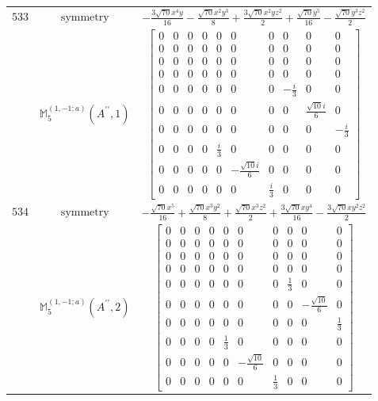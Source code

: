 \documentclass[fleqn,8pt,landscape]{jsarticle}
\begin{document}
\begin{longtable}{ccc}
$ 533 $ & $ \text{symmetry} $ & $ - \frac{3 \sqrt{70} x^{4} y}{16} - \frac{\sqrt{70} x^{2} y^{3}}{8} + \frac{3 \sqrt{70} x^{2} y z^{2}}{2} + \frac{\sqrt{70} y^{5}}{16} - \frac{\sqrt{70} y^{3} z^{2}}{2} $ \\
$  $ & $ \mathbb{M}_{5}^{(1,-1;a)}(A^{\prime\prime},1) $ & $ \begin{bmatrix} 0 & 0 & 0 & 0 & 0 & 0 & 0 & 0 & 0 & 0 \\ 0 & 0 & 0 & 0 & 0 & 0 & 0 & 0 & 0 & 0 \\ 0 & 0 & 0 & 0 & 0 & 0 & 0 & 0 & 0 & 0 \\ 0 & 0 & 0 & 0 & 0 & 0 & 0 & 0 & 0 & 0 \\ 0 & 0 & 0 & 0 & 0 & 0 & 0 & - \frac{i}{3} & 0 & 0 \\ 0 & 0 & 0 & 0 & 0 & 0 & 0 & 0 & \frac{\sqrt{10} i}{6} & 0 \\ 0 & 0 & 0 & 0 & 0 & 0 & 0 & 0 & 0 & - \frac{i}{3} \\ 0 & 0 & 0 & 0 & \frac{i}{3} & 0 & 0 & 0 & 0 & 0 \\ 0 & 0 & 0 & 0 & 0 & - \frac{\sqrt{10} i}{6} & 0 & 0 & 0 & 0 \\ 0 & 0 & 0 & 0 & 0 & 0 & \frac{i}{3} & 0 & 0 & 0 \end{bmatrix} $ \\ \hline
$ 534 $ & $ \text{symmetry} $ & $ - \frac{\sqrt{70} x^{5}}{16} + \frac{\sqrt{70} x^{3} y^{2}}{8} + \frac{\sqrt{70} x^{3} z^{2}}{2} + \frac{3 \sqrt{70} x y^{4}}{16} - \frac{3 \sqrt{70} x y^{2} z^{2}}{2} $ \\
$  $ & $ \mathbb{M}_{5}^{(1,-1;a)}(A^{\prime\prime},2) $ & $ \begin{bmatrix} 0 & 0 & 0 & 0 & 0 & 0 & 0 & 0 & 0 & 0 \\ 0 & 0 & 0 & 0 & 0 & 0 & 0 & 0 & 0 & 0 \\ 0 & 0 & 0 & 0 & 0 & 0 & 0 & 0 & 0 & 0 \\ 0 & 0 & 0 & 0 & 0 & 0 & 0 & 0 & 0 & 0 \\ 0 & 0 & 0 & 0 & 0 & 0 & 0 & \frac{1}{3} & 0 & 0 \\ 0 & 0 & 0 & 0 & 0 & 0 & 0 & 0 & - \frac{\sqrt{10}}{6} & 0 \\ 0 & 0 & 0 & 0 & 0 & 0 & 0 & 0 & 0 & \frac{1}{3} \\ 0 & 0 & 0 & 0 & \frac{1}{3} & 0 & 0 & 0 & 0 & 0 \\ 0 & 0 & 0 & 0 & 0 & - \frac{\sqrt{10}}{6} & 0 & 0 & 0 & 0 \\ 0 & 0 & 0 & 0 & 0 & 0 & \frac{1}{3} & 0 & 0 & 0 \end{bmatrix} $ \\ \hline

\end{longtable}
\end{document}
